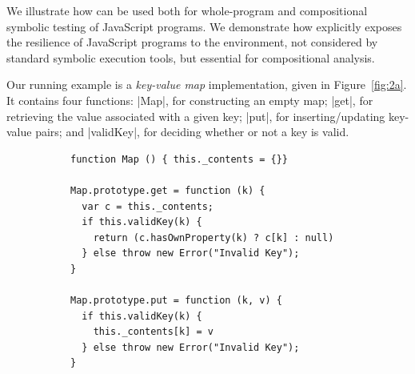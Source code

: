 
We illustrate how \cosette can be used both for whole-program and compositional symbolic testing of JavaScript programs. We demonstrate how \cosette  explicitly exposes the resilience of JavaScript programs to the environment, not considered by standard symbolic execution tools, but essential for compositional analysis.

Our running example is a \emph{key-value map} implementation, given in Figure~\ref{fig:2a}. It contains four functions: 
\jsinline|Map|, for constructing an empty map;
\jsinline|get|, for retrieving the value associated with a given key;
\jsinline|put|, for inserting/updating key-value pairs; and \jsinline|validKey|, for deciding whether or not a key is valid.

 \begin{figure}[t]
 \centering
 \begin{subfigure}[b]{0.33\textwidth}
 {
 \begin{lstlisting}
function Map () { this._contents = {}}

Map.prototype.get = function (k) {
  var c = this._contents;
  if this.validKey(k) {
    return (c.hasOwnProperty(k) ? c[k] : null)
  } else throw new Error("Invalid Key");
}

Map.prototype.put = function (k, v) {
  if this.validKey(k) {  
    this._contents[k] = v   
  } else throw new Error("Invalid Key");
} 


\end{lstlisting}}
\end{subfigure}
\end{figure}
